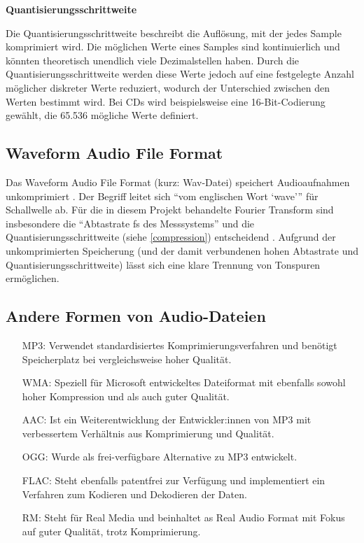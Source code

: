%
\textbf{Quantisierungsschrittweite}
%

Die Quantisierungsschrittweite beschreibt die Auflösung, mit der jedes Sample komprimiert wird. Die möglichen Werte eines Samples sind kontinuierlich und könnten theoretisch unendlich viele Dezimalstellen haben. Durch die Quantisierungsschrittweite werden diese Werte jedoch auf eine festgelegte Anzahl möglicher diskreter Werte reduziert, wodurch der Unterschied zwischen den Werten bestimmt wird. Bei CDs wird beispielsweise eine 16-Bit-Codierung gewählt, die 65.536 mögliche Werte definiert.

%
\subsection{Waveform Audio File Format}
%

Das Waveform Audio File Format (kurz: Wav-Datei) speichert Audioaufnahmen unkomprimiert \parencite{what_is_a_wav_file}. Der Begriff leitet sich \enquote{vom englischen Wort \enquote{wave}} \parencite{wav} für Schallwelle ab. Für die in diesem Projekt behandelte Fourier Transform sind insbesondere die \enquote{Abtastrate fs des Messsystems} und die Quantisierungsschrittweite (siehe \cref{compression}) entscheidend  \parencite{FFT_grundlagen}. Aufgrund der unkomprimierten Speicherung (und der damit verbundenen hohen Abtastrate und Quantisierungsschrittweite) lässt sich eine klare Trennung von Tonspuren ermöglichen.


%
\subsection{Andere Formen von Audio-Dateien}
\label{audio_representations}
%

%
\begin{itemize}
    \item [MP3:] Verwendet standardisiertes Komprimierungsverfahren und benötigt Speicherplatz bei vergleichsweise hoher Qualität.
    \item [WMA:] Speziell für Microsoft entwickeltes Dateiformat mit ebenfalls sowohl hoher Kompression und als auch guter Qualität.
    \item [AAC:] Ist ein Weiterentwicklung der Entwickler:innen von MP3 mit verbessertem Verhältnis aus Komprimierung und Qualität.
    \item [OGG:] Wurde als frei-verfügbare Alternative zu MP3 entwickelt.
    \item [FLAC:] Steht ebenfalls patentfrei zur Verfügung und implementiert ein Verfahren zum Kodieren und Dekodieren der Daten.
    \item [RM:] Steht für Real Media und beinhaltet as Real Audio Format mit Fokus auf guter Qualität, trotz Komprimierung.
\end{itemize}
%

